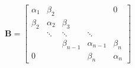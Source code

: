 \[\mathbf{B}=\begin{bmatrix}\alpha_{1}&\beta_{2}&&&0\\
\beta_{2}&\alpha_{2}&\beta_{3}&&\\
&\ddots&\ddots&\ddots&\\
&&\beta_{n-1}&\alpha_{n-1}&\beta_{n}\\
0&&&\beta_{n}&\alpha_{n}\end{bmatrix}\]